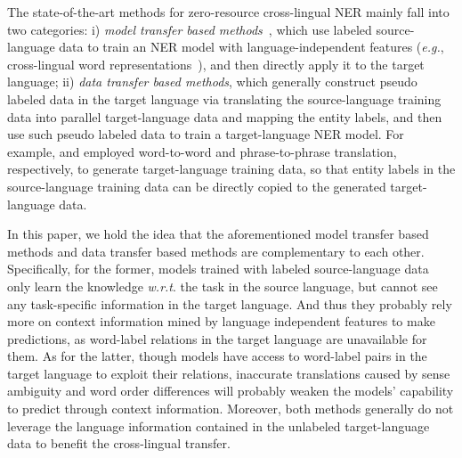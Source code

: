 \documentclass{article}
\newcommand\eg{\textit{e.g.}}
\newcommand\wrt{\textit{w.r.t}}
\begin{document}
The state-of-the-art methods for zero-resource cross-lingual NER mainly fall into two categories: 
i) \emph{model transfer based methods}~\cite{wu2019beto,wu2020enhanced}, which use labeled source-language data to train an NER model with language-independent features (\eg{}, cross-lingual word representations~\cite{devlin2019bert}), and then directly apply it to the target language;
ii) \emph{data transfer based methods}, which generally construct pseudo labeled data in the target language via translating the source-language training data into parallel target-language data and mapping the entity labels, and then use such pseudo labeled data to train a target-language NER model.
For example, \cite{mayhew2017cheap} and \cite{xie2018neural} employed word-to-word and phrase-to-phrase translation, respectively, to generate target-language training data, so that entity labels in the source-language training data can be directly copied to the generated target-language data.


In this paper, we hold the idea that the aforementioned model transfer based methods and data transfer based methods are complementary to each other. 
Specifically, for the former, models trained with labeled source-language data only learn the knowledge \wrt. the task in the source language, but cannot see any task-specific information in the target language. 
And thus they probably rely more on context information mined by language independent features to make predictions, as word-label relations in the target language are unavailable for them.
As for the latter, though models have access to word-label pairs in the target language to exploit their relations, inaccurate translations caused by sense ambiguity and word order differences will probably weaken the models' capability to predict through context information. 
Moreover, both methods generally do not leverage the language information contained in the unlabeled target-language data to benefit the cross-lingual transfer.
\end{document}
